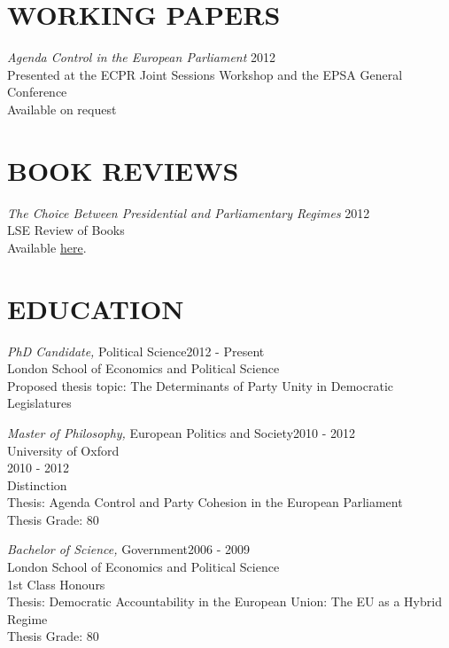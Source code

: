 \documentclass[line,margin]{res}
\begin{document}
\address {07742 506757, jack.blumenau@lse.ac.uk }

 
\begin{resume}
 
\section{WORKING PAPERS} {\sl Agenda Control in the European Parliament} \hfill 2012\\
Presented at the ECPR Joint Sessions Workshop and the EPSA General Conference\\
Available on request

\section{BOOK REVIEWS} {\sl The Choice Between Presidential and Parliamentary Regimes} \hfill 2012\\
LSE Review of Books\\
Available \href{http://blogs.lse.ac.uk/lsereviewofbooks/2012/09/20/presidents-parties-and-prime-ministers/}{here}.

\section{EDUCATION} {\sl PhD Candidate,} Political Science\hfill 2012 - Present\\
                London School of Economics and Political Science\\         
                Proposed thesis topic: The Determinants of Party Unity in Democratic Legislatures
	

					{\sl Master of Philosophy,} European Politics and Society\hfill 2010 - 2012 \\
                University of Oxford\\ 
                2010 - 2012 \\
                Distinction \\
                Thesis: Agenda Control and Party Cohesion in the European Parliament\\
				Thesis Grade: 80

					{\sl Bachelor of Science,} Government\hfill 2006 - 2009 \\
                London School of Economics and Political Science\\
                1st Class Honours \\
                Thesis: Democratic Accountability in the European Union: The EU as a Hybrid Regime\\
				Thesis Grade: 80
				

\end{resume}
\end{document}
